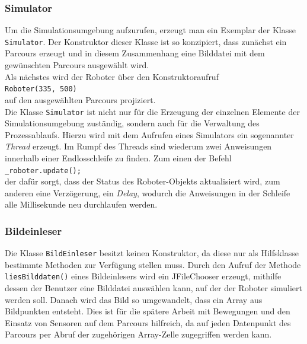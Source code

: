 \documentclass[paper=a4, DIV=calc, BCOR=12mm, twoside=on, onecolumn=on, open = right, titlepage =on, parskip =half-, headsepline = on, footsepline = off, chapterprefix = off, appendixprefix = on, fontsize = 12pt, numbers = noenddot, abstract = on]{scrbook}
\begin{document}
\vspace*{-2ex}
\subsubsection{Simulator}

Um die Simulationsumgebung aufzurufen, erzeugt man ein Exemplar der Klasse \texttt{Si\-mu\-la\-tor}. Der Konstruktor dieser Klasse ist so konzipiert, dass zunächst ein Parcours erzeugt und in diesem Zusammenhang eine Bilddatei mit dem gewünschten Parcours ausgewählt wird.\\
Als nächstes wird der Roboter über den Konstruktoraufruf\\
\hspace*{2em}\texttt{Roboter(335, 500)}\\
auf den ausgewählten Parcours projiziert.\\
Die Klasse \texttt{Simulator} ist nicht nur für die Erzeugung der einzelnen Elemente der Simulationsumgebung zuständig, sondern auch für die Verwaltung des Prozessablaufs. Hierzu wird mit dem Aufrufen eines Simulators ein sogenannter \emph{Thread} erzeugt. Im Rumpf des Threads sind wiederum zwei Anweisungen innerhalb einer Endlosschleife zu finden. Zum einen der Befehl\\
\hspace*{2em} \texttt{{\_}roboter.update();}\\
der dafür sorgt, dass der Status des Roboter-Objekts aktualisiert wird, zum anderen eine Verzögerung, ein \emph{Delay}, wodurch die Anweisungen in der Schleife alle Millisekunde neu durchlaufen werden. 


\subsubsection{Bildeinleser}
Die Klasse \texttt{BildEinleser} besitzt keinen Konstruktor, da diese nur als Hilfsklasse bestimmte Methoden zur Verfügung stellen muss. Durch den Aufruf der Methode\\
\texttt{liesBilddaten()} eines Bildeinlesers wird ein JFileChooser erzeugt, mithilfe dessen der Benutzer eine Bilddatei auswählen kann, auf der der Roboter simuliert werden soll. Danach wird das Bild so umgewandelt, dass ein Array aus Bildpunkten entsteht. Dies ist für die spätere Arbeit mit Bewegungen und den Einsatz von Sensoren auf dem Parcours hilfreich, da auf jeden Datenpunkt des Parcours per Abruf der zugehörigen Array-Zelle zugegriffen werden kann.
\end{document}
